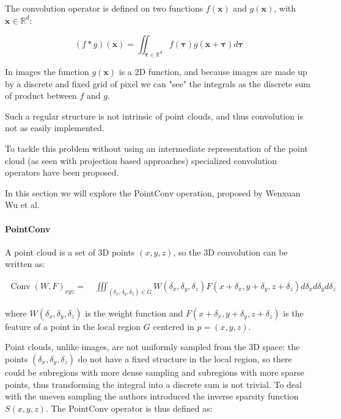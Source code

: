 The convolution operator is defined on two functions $f(\mathbf{x})$ and $g(\mathbf{x})$, with $\mathbf{x} \in \mathbb{R}^{d}$: 

\begin{equation}
    (f * g)(\mathbf{x})=\iint_{\boldsymbol{\tau} \in \mathbb{R}^{d}} f(\boldsymbol{\tau}) g(\mathbf{x}+\boldsymbol{\tau}) d \boldsymbol{\tau}
\end{equation}

In images the function $g(\mathbf{x})$ is a 2D function, and because images are made up by a discrete and fixed grid of pixel we can "see" the integrals as the discrete sum of product between $f$ and $g$.

Such a regular structure is not intrinsic of point clouds, and thus convolution is not as easily implemented.

To tackle this problem without using an intermediate representation of the point cloud (as seen with projection based approaches) specialized convolution operators have been proposed.

In this section we will explore the PointConv operation, proposed by Wenxuan Wu et al.~\cite{PointConv}
\paragraph{PointConv}

A point cloud is a set of 3D points $(x,y,z)$, so the 3D convolution can be written as: 

\begin{equation}
    \begin{array}{l}
\operatorname{Conv}(W, F)_{x y z}= 
\quad \iiint_{\left(\delta_{x}, \delta_{y}, \delta_{z}\right) \in G} W\left(\delta_{x}, \delta_{y}, \delta_{z}\right) F\left(x+\delta_{x}, y+\delta_{y}, z+\delta_{z}\right) d \delta_{x} d \delta_{y} d \delta_{z}
\end{array}
\end{equation}

where $W(\delta_{x}, \delta_{y}, \delta_{z})$ is the weight function and $F\left(x+\delta_{x}, y+\delta_{y}, z+\delta_{z}\right)$ is the feature of a point in the local region $G$ centered in  $p = (x,y,z)$.

Point clouds, unlike images, are not uniformly sampled from the 3D space: the points $(\delta_{x}, \delta_{y}, \delta_{z})$ do not have a fixed structure in the local region, so there could be subregions with more dense sampling and subregions with more sparse points, thus transforming the integral into a discrete sum is not trivial.
To deal with the uneven sampling the authors introduced the inverse sparsity function $S(x,y,z)$. The PointConv operator is thus defined as:


